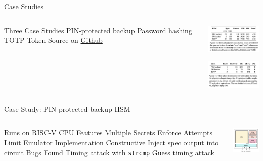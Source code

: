 \begin{frame}{Case Studies}
\begin{columns}
  \begin{outline}
    \1 Three Case Studies
    \2 PIN-protected backup
    \2 Password hashing
    \2 TOTP Token
    \1 Source on \href{https://github.com/anishathalye/knox-hsm}{Github}
  \end{outline}

  \centering
  \begin{center}
  \includegraphics[width=4cm]{fig_16.png}

  \vspace{0.5cm}

  \includegraphics[width=4cm]{fig_18.png}
\end{center}
\end{columns}
\end{frame}

\begin{frame}{Case Study: PIN-protected backup HSM}
\begin{columns}
  \begin{outline}
    \1 Runs on RISC-V CPU
    \1 Features
    \2 Multiple Secrets
    \2 Enforce Attempts Limit
    \1 Emulator Implementation
    \2 Constructive
    \2 Inject spec output into circuit
    \1 Bugs Found
    \2 Timing attack with \lstinline{strcmp}
    \2 Guess timing attack 
  \end{outline}
  \centering
  \begin{center}
    \includegraphics[width=4cm]{ppb_ex_diagram.png}
  \end{center}
\end{columns}
\end{frame}

